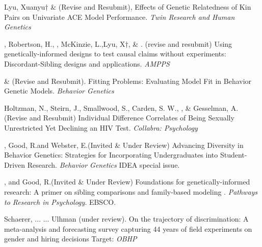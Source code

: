 



\item Lyu, Xuanyu$\dagger$ \&  \meb (Revise and Resubmit), Effects of Genetic Relatedness of Kin Pairs on Univariate ACE Model Performance. \textit{Twin Research and Human Genetics}

\item \meb, Robertson, H.\noteA, \jt, McKinzie, L.,\noteA Lyu, X$\dagger$, \& \joe. (revise and resubmit) Using genetically-informed designs to test causal claims without experiments: Discordant-Sibling designs and applications. \href{https://osf.io/zpdwt/}{\small\color{blue}{osf.io/zpdwt/}} \textit{AMPPS} %

\item \meb \& \joe (Revise and Resubmit). Fitting Problems: Evaluating Model Fit in Behavior Genetic Models. \textit{Behavior Genetics}  \href{https://doi.org/10.31234/osf.io/qys83}{\small\color{blue}{10.31234/osf.io/qys83}}
\item Holtzman, N., Steirn, J., Smallwood, S., Carden, S. W., \meb, \& Gesselman, A. (Revise and Resubmit) Individual Difference Correlates of Being Sexually Unrestricted Yet Declining an HIV Test. \textit{Collabra: Psychology}%

\item \meb, Good, R.\noteA and Webster, E.\noteA  (Invited \& Under Review) Advancing Diversity in Behavior Genetics: Strategies for Incorporating Undergraduates into Student-Driven Research. \textit{Behavior Genetics} IDEA special issue. \href{10.31234/osf.io/9x7wf}{\small\color{blue}{10.31234/osf.io/9x7wf}} 

\item \meb, and Good, R.\noteA (Invited \& Under Review) Foundations for genetically-informed research: A primer on sibling comparisons and family-based modeling
. \textit{Pathways to Research in Psychology}. EBSCO.


\item Schaerer, ... \meb ... Ulhman (under review). On the trajectory of discrimination: A meta-analysis and forecasting survey capturing 44 years of field experiments on gender and hiring decisions  Target: \textit{OBHP}

